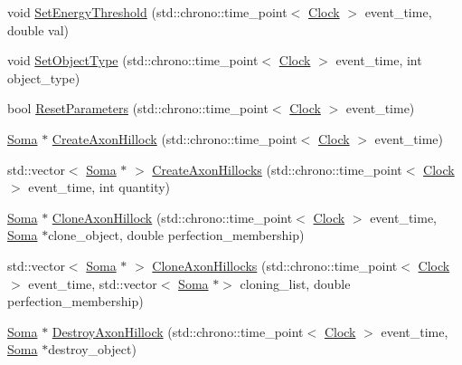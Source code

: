 \begin{DoxyCompactItemize}
\item 
void \mbox{\hyperlink{classSoma_ae2876b37909f37e8922ce364eb06491f}{Set\+Energy\+Threshold}} (std\+::chrono\+::time\+\_\+point$<$ \mbox{\hyperlink{universe_8h_a0ef8d951d1ca5ab3cfaf7ab4c7a6fd80}{Clock}} $>$ event\+\_\+time, double val)
\item 
void \mbox{\hyperlink{classSoma_a85b4708eb51ab0962a6128b87aff0700}{Set\+Object\+Type}} (std\+::chrono\+::time\+\_\+point$<$ \mbox{\hyperlink{universe_8h_a0ef8d951d1ca5ab3cfaf7ab4c7a6fd80}{Clock}} $>$ event\+\_\+time, int object\+\_\+type)
\item 
bool \mbox{\hyperlink{classSoma_a82f016dc126f7d1053e5eb455d28c44b}{Reset\+Parameters}} (std\+::chrono\+::time\+\_\+point$<$ \mbox{\hyperlink{universe_8h_a0ef8d951d1ca5ab3cfaf7ab4c7a6fd80}{Clock}} $>$ event\+\_\+time)
\item 
\mbox{\hyperlink{classSoma}{Soma}} $\ast$ \mbox{\hyperlink{classSoma_a42289635de3cb326bceeb5358b99c190}{Create\+Axon\+Hillock}} (std\+::chrono\+::time\+\_\+point$<$ \mbox{\hyperlink{universe_8h_a0ef8d951d1ca5ab3cfaf7ab4c7a6fd80}{Clock}} $>$ event\+\_\+time)
\item 
std\+::vector$<$ \mbox{\hyperlink{classSoma}{Soma}} $\ast$ $>$ \mbox{\hyperlink{classSoma_ab059a6d4a7dc41664d6d17794d09b260}{Create\+Axon\+Hillocks}} (std\+::chrono\+::time\+\_\+point$<$ \mbox{\hyperlink{universe_8h_a0ef8d951d1ca5ab3cfaf7ab4c7a6fd80}{Clock}} $>$ event\+\_\+time, int quantity)
\item 
\mbox{\hyperlink{classSoma}{Soma}} $\ast$ \mbox{\hyperlink{classSoma_a31463fba2f535e9c7cb05c8622fe3562}{Clone\+Axon\+Hillock}} (std\+::chrono\+::time\+\_\+point$<$ \mbox{\hyperlink{universe_8h_a0ef8d951d1ca5ab3cfaf7ab4c7a6fd80}{Clock}} $>$ event\+\_\+time, \mbox{\hyperlink{classSoma}{Soma}} $\ast$clone\+\_\+object, double perfection\+\_\+membership)
\item 
std\+::vector$<$ \mbox{\hyperlink{classSoma}{Soma}} $\ast$ $>$ \mbox{\hyperlink{classSoma_a299c95b89f50576244d1e56f531a80be}{Clone\+Axon\+Hillocks}} (std\+::chrono\+::time\+\_\+point$<$ \mbox{\hyperlink{universe_8h_a0ef8d951d1ca5ab3cfaf7ab4c7a6fd80}{Clock}} $>$ event\+\_\+time, std\+::vector$<$ \mbox{\hyperlink{classSoma}{Soma}} $\ast$$>$ cloning\+\_\+list, double perfection\+\_\+membership)
\item 
\mbox{\hyperlink{classSoma}{Soma}} $\ast$ \mbox{\hyperlink{classSoma_af6d6d3e3c94f06682cf05a7a72032a46}{Destroy\+Axon\+Hillock}} (std\+::chrono\+::time\+\_\+point$<$ \mbox{\hyperlink{universe_8h_a0ef8d951d1ca5ab3cfaf7ab4c7a6fd80}{Clock}} $>$ event\+\_\+time, \mbox{\hyperlink{classSoma}{Soma}} $\ast$destroy\+\_\+object)
$$
\end{DoxyCompactItemize}
